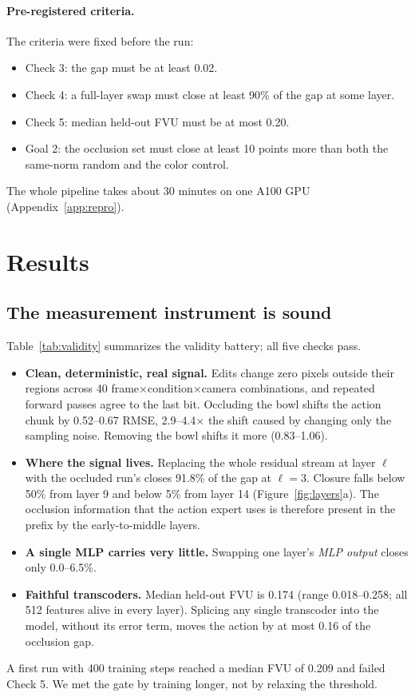 \documentclass{article} %
\begin{document}
\paragraph{Pre-registered criteria.} The criteria were fixed before the run:
\begin{itemize}[leftmargin=*,itemsep=0pt,topsep=1pt]
  \item Check 3: the gap must be at least 0.02.
  \item Check 4: a full-layer swap must close at least 90\% of the gap at some layer.
  \item Check 5: median held-out FVU must be at most 0.20.
  \item Goal 2: the occlusion set must close at least 10 points more than both the same-norm random and the color control.
\end{itemize}
The whole pipeline takes about 30 minutes on one A100 GPU (Appendix~\ref{app:repro}).

\section{Results}
\label{sec:results}

\subsection{The measurement instrument is sound}
\label{sec:validity}
Table~\ref{tab:validity} summarizes the validity battery; all five checks pass.
\begin{itemize}[leftmargin=*,itemsep=1pt,topsep=2pt]
  \item \textbf{Clean, deterministic, real signal.} Edits change zero pixels outside their regions across 40 frame$\times$condition$\times$camera combinations, and repeated forward passes agree to the last bit. Occluding the bowl shifts the action chunk by 0.52--0.67 RMSE, 2.9--4.4$\times$ the shift caused by changing only the sampling noise. Removing the bowl shifts it more (0.83--1.06).
  \item \textbf{Where the signal lives.} Replacing the whole residual stream at layer $\ell$ with the occluded run's closes 91.8\% of the gap at $\ell{=}3$. Closure falls below 50\% from layer 9 and below 5\% from layer 14 (Figure~\ref{fig:layers}a). The occlusion information that the action expert uses is therefore present in the prefix by the early-to-middle layers.
  \item \textbf{A single MLP carries very little.} Swapping one layer's \emph{MLP output} closes only 0.0--6.5\%.
  \item \textbf{Faithful transcoders.} Median held-out FVU is 0.174 (range 0.018--0.258; all 512 features alive in every layer). Splicing any single transcoder into the model, without its error term, moves the action by at most 0.16 of the occlusion gap.
\end{itemize}
A first run with 400 training steps reached a median FVU of 0.209 and failed Check 5. We met the gate by training longer, not by relaxing the threshold.
\end{document}
